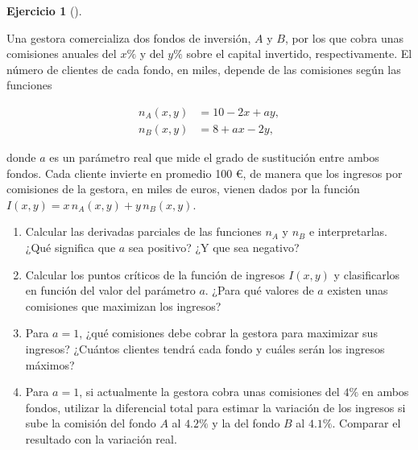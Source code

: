 \documentclass[
  spanish,
  a4paper,
]{scrreport}
\theoremstyle{definition}
\newtheorem{exercise}{Ejercicio}[chapter]
\theoremstyle{remark}
\begin{document}
\begin{exercise}[]\protect\hypertarget{exr-2}{}\label{exr-2}

Una gestora comercializa dos fondos de inversión, \(A\) y \(B\), por los
que cobra unas comisiones anuales del \(x\%\) y del \(y\%\) sobre el
capital invertido, respectivamente. El número de clientes de cada fondo,
en miles, depende de las comisiones según las funciones

\begin{align*}
n_A(x,y) &= 10 - 2x + ay,\\
n_B(x,y) &= 8 + ax - 2y,
\end{align*}

donde \(a\) es un parámetro real que mide el grado de sustitución entre
ambos fondos. Cada cliente invierte en promedio 100 €, de manera que los
ingresos por comisiones de la gestora, en miles de euros, vienen dados
por la función \(I(x,y) = x\,n_A(x,y) + y\,n_B(x,y)\).

\begin{enumerate}
\def\labelenumi{\alph{enumi}.}
\item
  Calcular las derivadas parciales de las funciones \(n_A\) y \(n_B\) e
  interpretarlas. ¿Qué significa que \(a\) sea positivo? ¿Y que sea
  negativo?
\item
  Calcular los puntos críticos de la función de ingresos \(I(x,y)\) y
  clasificarlos en función del valor del parámetro \(a\). ¿Para qué
  valores de \(a\) existen unas comisiones que maximizan los ingresos?
\item
  Para \(a=1\), ¿qué comisiones debe cobrar la gestora para maximizar
  sus ingresos? ¿Cuántos clientes tendrá cada fondo y cuáles serán los
  ingresos máximos?
\item
  Para \(a=1\), si actualmente la gestora cobra unas comisiones del
  \(4\%\) en ambos fondos, utilizar la diferencial total para estimar la
  variación de los ingresos si sube la comisión del fondo \(A\) al
  \(4.2\%\) y la del fondo \(B\) al \(4.1\%\). Comparar el resultado con
  la variación real.
\end{enumerate}

\end{exercise}
\end{document}
